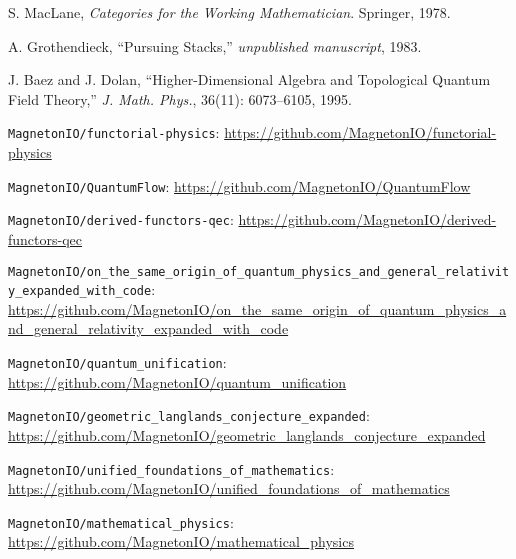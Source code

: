 \documentclass[11pt]{article}
\begin{document}
\begin{thebibliography}{99}

S. MacLane, \textit{Categories for the Working Mathematician}. Springer, 1978.

A. Grothendieck, ``Pursuing Stacks,'' \textit{unpublished manuscript}, 1983.

J. Baez and J. Dolan, ``Higher-Dimensional Algebra and Topological Quantum Field Theory,'' \textit{J. Math. Phys.}, 36(11): 6073--6105, 1995.

\texttt{MagnetonIO/functorial-physics}: \url{https://github.com/MagnetonIO/functorial-physics}

\texttt{MagnetonIO/QuantumFlow}: \url{https://github.com/MagnetonIO/QuantumFlow}

\texttt{MagnetonIO/derived-functors-qec}: \url{https://github.com/MagnetonIO/derived-functors-qec}

\texttt{MagnetonIO/on\_the\_same\_origin\_of\_quantum\_physics\_and\_general\_relativity\_expanded\_with\_code}:
\url{https://github.com/MagnetonIO/on_the_same_origin_of_quantum_physics_and_general_relativity_expanded_with_code}

\texttt{MagnetonIO/quantum\_unification}: \url{https://github.com/MagnetonIO/quantum_unification}

\texttt{MagnetonIO/geometric\_langlands\_conjecture\_expanded}: \url{https://github.com/MagnetonIO/geometric_langlands_conjecture_expanded}

\texttt{MagnetonIO/unified\_foundations\_of\_mathematics}: \url{https://github.com/MagnetonIO/unified_foundations_of_mathematics}

\texttt{MagnetonIO/mathematical\_physics}: \url{https://github.com/MagnetonIO/mathematical_physics}

\end{thebibliography}
\end{document}
